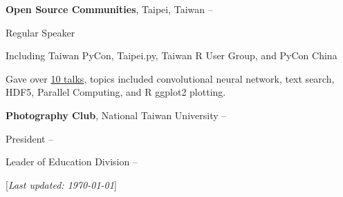 \documentclass[a4paper,12pt,oneside]{article}
\newcommand{\CVNote}{Last updated: {\today}}
\begin{document}
\begin{body}
\BigEntryGapNoBreak
\textbf{Open Source Communities}, Taipei, Taiwan
\hfill
{} --
\par
Regular Speaker
\begin{detail}
    \begin{detailitem}
    \item Including Taiwan PyCon, Taipei.py, Taiwan R User Group, and PyCon China
    \item Gave over \href{http://blog.liang2.tw/talks/#talks}{10 talks}, topics included
        convolutional neural network, text search,
        HDF5, Parallel Computing, and R ggplot2 plotting.
    \end{detailitem}
\end{detail}

\BigEntryGap
\textbf{Photography Club},
National Taiwan University
\hfill
{} --

President
\hfill
{} --

Leader of Education Division
\hfill
{} --

%
\end{body}


\begin{flushright}
\scriptsize%
[\textit{\CVNote}]%
\hspace{2.0mm}\null
\end{flushright}

\label{LastPage}
\end{document}
